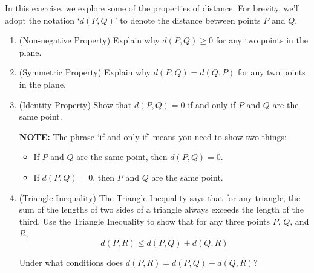 \documentclass{ximera}
\begin{document}
\begin{problem}\label{distancemetricprops}
In this exercise, we explore some of the properties of distance.  For brevity, we'll adopt the notation `$d(P,Q)$' to denote the distance between points $P$ and $Q$.
\begin{enumerate}  

\item  (Non-negative Property) Explain why $d(P,Q) \geq 0$ for any two points in the plane.

\item  (Symmetric Property) Explain why $d(P,Q) = d(Q,P)$ for any two points in the plane.

\item  (Identity Property) Show that $d(P,Q) = 0$ \underline{if and only if} $P$ and $Q$ are the same point.

\textbf{NOTE:}  The phrase `if and only if' means you need to show two things:

\begin{itemize}

\item  If $P$ and $Q$ are the same point, then $d(P,Q) = 0$.
\item  If $d(P,Q) = 0$, then $P$ and $Q$ are the same point.


\end{itemize}




\item  (Triangle Inequality) The \href{http://en.wikipedia.org/wiki/Triangle_inequality}{\underline{Triangle Inequality}} says that for any triangle, the sum of the lengths of two sides of a triangle always exceeds the length of the third.  Use the Triangle Inequality to show that for any three points $P$, $Q$, and $R$, \[ d(P,R) \leq d(P,Q) + d(Q,R) \]

Under what conditions does $d(P,R) = d(P,Q) + d(Q,R)$?

\end{enumerate} 
\end{problem}
\end{document}
